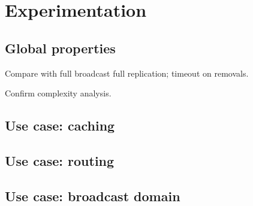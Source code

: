 
\section{Experimentation}
\label{sec:experimentation}

\subsection{Global properties}

Compare with full broadcast full replication; timeout on removals.

Confirm complexity analysis.

\subsection{Use case: caching}

\subsection{Use case: routing}

\subsection{Use case: broadcast domain}


